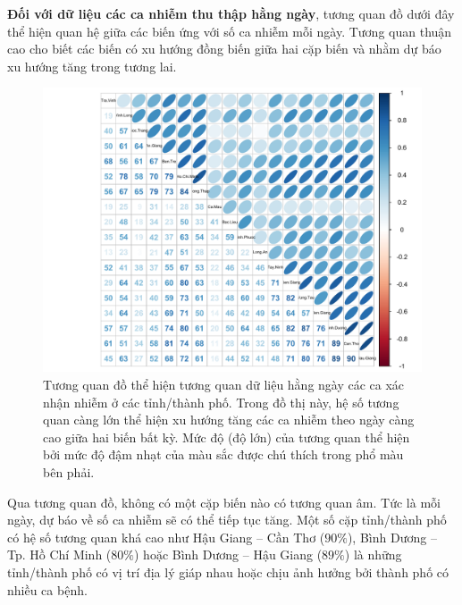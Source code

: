\documentclass[../thesis.tex]{subfiles}
\begin{document}
\textbf{Đối với dữ liệu các ca nhiễm thu thập hằng ngày}, tương quan đồ dưới đây thể hiện quan hệ giữa các biến ứng với số ca nhiễm mỗi ngày. Tương quan thuận cao cho biết các biến có xu hướng đồng biến giữa hai cặp biến và nhằm dự báo xu hướng tăng trong tương lai.

\begin{Shaded}
	\begin{Highlighting}[]
\SpecialCharTok{::}\OtherTok{\textless{}{-}} \SpecialCharTok{\%\textgreater{}\%} \NormalTok{()}\NormalTok{, }
		 \NormalTok{, }
		 \NormalTok{, }
		\NormalTok{,}
		 \NormalTok{,}
		\NormalTok{)}
	\end{Highlighting}
\end{Shaded}
\begin{figure}[H]
	\centering
	\includegraphics[width=0.8\linewidth]{images/corr_case}
	\caption[Tương quan đồ thể hiện tương quan dữ liệu hằng ngày các ca xác nhận nhiễm ở các tỉnh/thành phố.]{Tương quan đồ thể hiện tương quan dữ liệu hằng ngày các ca xác nhận nhiễm ở các tỉnh/thành phố. Trong đồ thị này, hệ số tương quan càng lớn thể hiện xu hướng tăng các ca nhiễm theo ngày càng cao giữa hai biến bất kỳ. Mức độ (độ lớn) của tương quan thể hiện bởi mức độ đậm nhạt của màu sắc được chú thích trong phổ màu bên phải.}
	\label{fig:corrcase}
\end{figure}

Qua tương quan đồ, không có một cặp biến nào có tương quan âm. Tức là mỗi ngày, dự báo về số ca nhiễm sẽ có thể tiếp tục tăng. Một số cặp tỉnh/thành phố có hệ số tương quan khá cao như Hậu Giang -- Cần Thơ ($ 90\% $), Bình Dương -- Tp. Hồ Chí Minh ($ 80\% $) hoặc Bình Dương -- Hậu Giang ($ 89\% $) là những tỉnh/thành phố có vị trí địa lý giáp nhau hoặc chịu ảnh hưởng bởi thành phố có nhiều ca bệnh.
\end{document}

